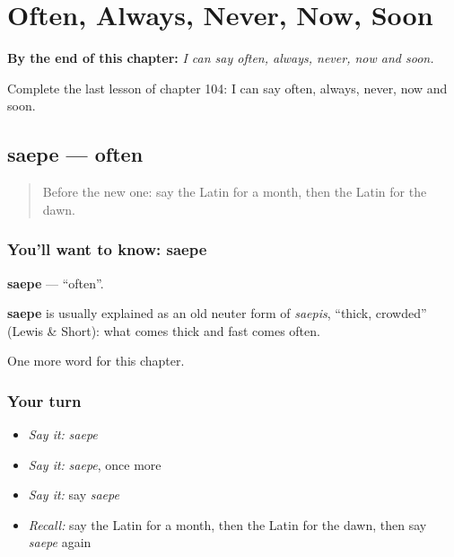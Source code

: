 
\chapter{Often, Always, Never, Now, Soon}
\label{ch:la-often-always-never-now-soon}

\begin{chapteropening}
\textbf{By the end of this chapter:} \emph{I can say often, always, never, now and soon.}

Complete the last lesson of chapter 104: I can say often, always, never, now and soon.
\end{chapteropening}

\section[saepe]{saepe — often}

\label{lesson:LA-C104-saepe}



\begin{quote}
Before the new one: say the Latin for a month, then the Latin for the dawn.
\end{quote}

\subsection*{You'll want to know: saepe}
\textbf{saepe} — \textquotedblleft{}often\textquotedblright{}.

\begin{cousinweb}
\textbf{saepe} is usually explained as an old neuter form of \emph{saepis}, \textquotedblleft{}thick, crowded\textquotedblright{} (Lewis \& Short): what comes thick and fast comes often.
\end{cousinweb}

\begin{grammarlens}[title={What you've built}]
One more word for this chapter.
\end{grammarlens}

\subsection*{Your turn}
\begin{itemize}
\raggedright
  \item \emph{Say it:} \emph{saepe}
  \item \emph{Say it:} \emph{saepe}, once more
  \item \emph{Say it:} say \emph{saepe}
  \item \emph{Recall:} say the Latin for a month, then the Latin for the dawn, then say \emph{saepe} again
\end{itemize}

